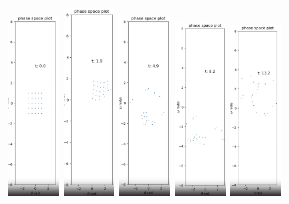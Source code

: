 \documentclass[11pt]{article} %
\begin{document}
    \begin{figure}[H]
        \centering
        \includegraphics[width=0.12\textwidth]{phase_0.png}
        \includegraphics[width=0.12\textwidth]{phase_1.png}
        \includegraphics[width=0.12\textwidth]{phase_2.png}
        \includegraphics[width=0.12\textwidth]{phase_3.png}
        \includegraphics[width=0.12\textwidth]{phase_4.png}

\end{figure}
\end{document}
